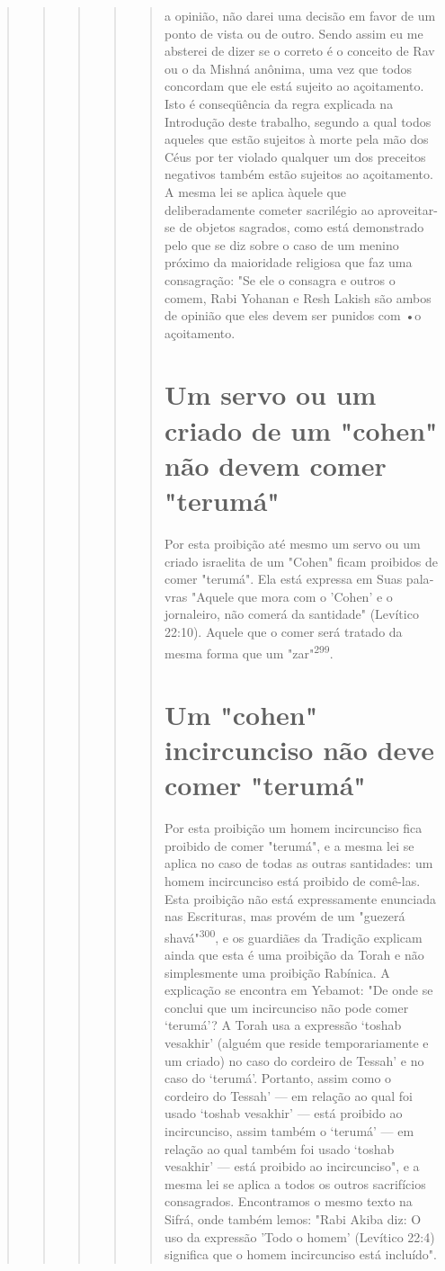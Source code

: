 \begin{quote}
\begin{quote}
\begin{quote}
\begin{quote}
\begin{quote}
a opinião, não darei uma decisão em favor de um ponto de vista ou de
outro. Sendo assim eu me absterei de dizer se o correto é o conceito de
Rav ou o da Mishná anônima, uma vez que todos concordam que ele está
sujeito ao açoita­mento. Isto é conseqüência da regra explicada na
Introdução deste trabalho, segundo a qual todos aqueles que estão
sujeitos à morte pela mão dos Céus por ter violado qualquer um dos
preceitos negativos também estão sujeitos ao açoitamento. A mesma lei se
aplica àquele que deliberadamente cometer sacri­légio ao aproveitar-se
de objetos sagrados, como está demonstrado pelo que se diz sobre o caso
de um menino próximo da maioridade religiosa que faz uma consagração:
"Se ele o consagra e outros o comem, Rabi Yohanan e Resh La­kish são
ambos de opinião que eles devem ser punidos com •o açoitamento.

\section{Um servo ou um criado de um "cohen" não devem comer "terumá"}

Por esta proibição até mesmo um servo ou um criado israelita de um
"Cohen" ficam proibidos de comer "terumá". Ela está expressa em Suas
pala­vras "Aquele que mora com o 'Cohen' e o jornaleiro, não comerá da
santida­de" (Levítico 22:10). Aquele que o comer será tratado da mesma
forma que um "zar"\textsuperscript{299}.

\section{Um "cohen" incircunciso não deve comer "terumá"}

Por esta proibição um homem incircunciso fica proibido de comer
"terumá", e a mesma lei se aplica no caso de todas as outras santidades:
um homem incircunciso está proibido de comê-las. Esta proibição não está
expres­samente enunciada nas Escrituras, mas provém de um "guezerá
shavá"\textsuperscript{300}, e os guardiães da Tradição explicam ainda
que esta é uma proibição da Torah e não simplesmente uma proibição
Rabínica. A explicação se encontra em Ye­bamot: "De onde se conclui que
um incircunciso não pode comer `terumá'? A Torah usa a expressão `toshab
vesakhir' (alguém que reside temporariamente e um criado) no caso do
cordeiro de Tessah' e no caso do `terumá'. Portanto, assim como o
cordeiro do Tessah' --- em relação ao qual foi usado `toshab ve­sakhir'
--- está proibido ao incircunciso, assim também o `terumá' --- em
rela­ção ao qual também foi usado `toshab vesakhir' --- está proibido ao
incircunci­so", e a mesma lei se aplica a todos os outros sacrifícios
consagrados. Encon­tramos o mesmo texto na Sifrá, onde também lemos:
"Rabi Akiba diz: O uso da expressão 'Todo o homem' (Levítico 22:4)
significa que o homem incircun­ciso está incluído".


\end{quote}
\end{quote}
\end{quote}
\end{quote}
\end{quote}
